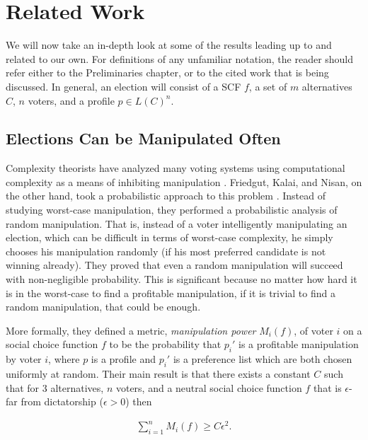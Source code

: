 
\chapter{Related Work}

	We will now take an in-depth look at some of the results leading up to and related to our own. For definitions of any unfamiliar notation, the reader should refer either to the Preliminaries chapter, or to the cited work that is being discussed. In general, an election will consist of a SCF $f$, a set of $m$ alternatives $C$, $n$ voters, and a profile $p \in L(C)^n$.


\section{Elections Can be Manipulated Often}

	Complexity theorists have analyzed many voting systems using computational complexity as a means of inhibiting manipulation \cite{bartholdi1989computational, hemaspaandra2009hybrid}. Friedgut, Kalai, and Nisan, on the other hand, took a probabilistic approach to this problem \cite{friedgut2008elections}. Instead of studying worst-case manipulation, they performed a probabilistic analysis of random manipulation. That is, instead of a voter intelligently manipulating an election, which can be difficult in terms of worst-case complexity, he simply chooses his manipulation randomly (if his most preferred candidate is not winning already). They proved that even a random manipulation will succeed with non-negligible probability. This is significant because no matter how hard it is in the worst-case to find a profitable manipulation, if it is trivial to find a random manipulation, that could be enough.

	More formally, they defined a metric, \emph{manipulation power} $M_i(f)$, of voter $i$ on a social choice function $f$ to be the probability that $p_i'$ is a profitable manipulation by voter $i$, where $p$ is a profile and $p_i'$ is a preference list which are both chosen uniformly at random. Their main result is that there exists a constant $C$ such that for 3 alternatives, $n$ voters, and a neutral social choice function $f$ that is $\epsilon$-far from dictatorship ($\epsilon > 0$) then

	\begin{align*}
		\sum_{i=1}^n M_i(f) \ge C \epsilon^2.
	\end{align*}

